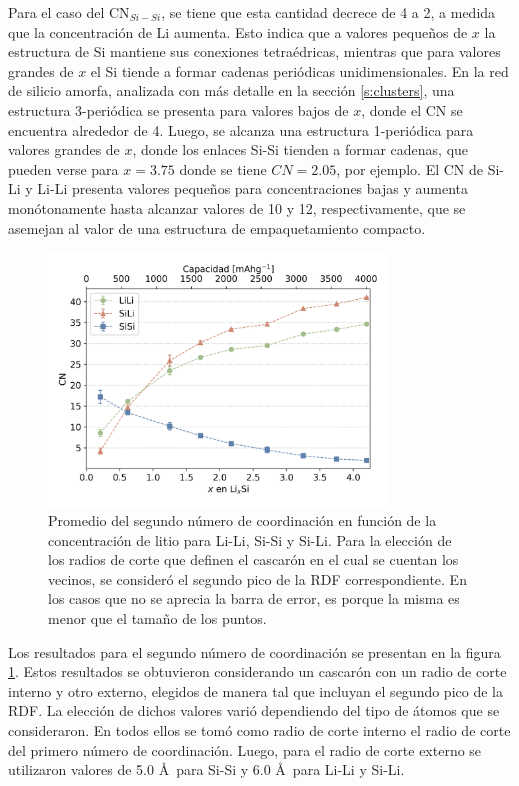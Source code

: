 Para el caso del CN$_{Si-Si}$, se tiene que esta cantidad decrece de 4 a 2, a 
medida que la concentración de Li aumenta. Esto indica que a valores pequeños de 
$x$ la estructura de Si mantiene sus conexiones tetraédricas, mientras que para
valores grandes de $x$ el Si tiende a formar cadenas periódicas unidimensionales.
En la red de silicio amorfa, analizada con más detalle en la sección 
\ref{s:clusters}, una estructura 3-periódica se presenta para valores bajos de 
$x$, donde el CN se encuentra alrededor de 4. Luego, se alcanza una estructura 1-periódica 
para valores grandes de $x$, donde los enlaces Si-Si tienden a formar 
cadenas, que pueden verse para $x = 3.75$ donde se tiene $CN = 2.05$, por ejemplo.
El CN de Si-Li y Li-Li presenta valores pequeños para concentraciones 
bajas y aumenta monótonamente hasta alcanzar valores de 10 y 12, respectivamente, 
que se asemejan al valor de una estructura de empaquetamiento compacto.

\begin{figure}[th]
    \centering
    \includegraphics[width=0.8\textwidth]{Silicio/caracterizacion/resultados/cn/cn2.png}
    \caption{Promedio del segundo número de coordinación en función de la 
    concentración de litio para Li-Li, Si-Si y Si-Li. Para la elección de los 
    radios de corte que definen el cascarón en el cual se cuentan los vecinos,
    se consideró el segundo pico de la RDF correspondiente. En los casos que no 
    se aprecia la barra de error, es porque la misma es menor que el tamaño de 
    los puntos.}
    \label{fig:cn2}
\end{figure}
Los resultados para el segundo número de coordinación se presentan en la figura 
\ref{fig:cn2}. Estos resultados se obtuvieron considerando un cascarón con un 
radio de corte interno y otro externo, elegidos de manera tal que incluyan el 
segundo pico de la RDF. La elección de dichos valores varió dependiendo del tipo
de átomos que se consideraron. En todos ellos se tomó como radio de corte interno 
el radio de corte del primero número de coordinación. Luego, para el radio de 
corte externo se utilizaron valores de 5.0 \AA\ para Si-Si y 6.0 \AA\ para Li-Li
y Si-Li.

